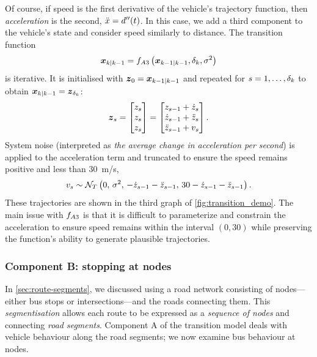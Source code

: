 Of course, if speed is the first derivative of the vehicle's trajectory function, then \emph{acceleration} is the second, $\ddot x = d''(t)$. In this case, we add a third component to the vehicle's state and consider speed similarly to distance. The transition function
\begin{equation}
\label{eq:vehicle_model_newton_accel}
\boldsymbol x_{k|k-1} = f_{A3}\left(\boldsymbol x_{k-1|k-1},\delta_k,\sigma^2\right)
\end{equation}
is iterative. It is initialised with $\boldsymbol z_0 = \boldsymbol x_{k-1|k-1}$ and repeated for $s = 1, \ldots, \delta_k$ to obtain $\boldsymbol x_{k|k-1} = \boldsymbol z_{\delta_k}$:
\begin{equation}
\label{eq:vehicle_model_newton_accel_iter}
\boldsymbol z_s =
\begin{bmatrix}
z_s \\ z_s \\ z_s
\end{bmatrix} =
\begin{bmatrix}
z_{s-1} + \dot z_s \\
\dot z_{s-1} + \ddot z_s \\
\ddot z_{s-1} + v_s
\end{bmatrix}.
\end{equation}
System noise (interpreted as \emph{the average change in acceleration per second}) is applied to the acceleration term and truncated to ensure the speed remains positive and less than 30~m/s,
\begin{equation}
\label{eq:vehicle_model_accel_dist}
v_s \sim \mathcal{N}_T\left(0,\, \sigma^2,\, -\dot z_{s-1} - \ddot z_{s-1},\, 30 - \dot z_{s-1} - \ddot z_{s-1}\right).
\end{equation}
These trajectories are shown in the third graph of \cref{fig:transition_demo}. The main issue with $f_{A3}$ is that it is difficult to parameterize and constrain the acceleration to ensure speed remains within the interval $(0,30)$ while preserving the function's ability to generate plausible trajectories.



\subsubsection{Component B: stopping at nodes}
\label{sec:vehicle_model_nodes}

In \cref{sec:route-segments}, we discussed using a road network consisting of nodes---either bus stops or intersections---and the roads connecting them. This \emph{segmentisation} allows each route to be expressed as a \emph{sequence of nodes} and connecting \emph{road segments}. Component A of the transition model deals with vehicle behaviour along the road segments; we now examine bus behaviour at nodes.

